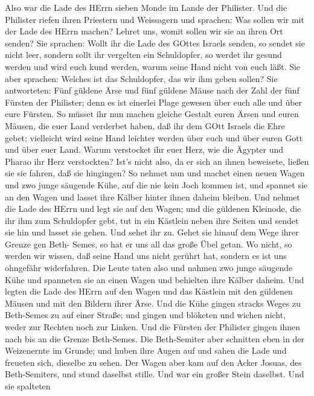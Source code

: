  Also war die Lade des HErrn sieben Monde im Lande der
Philister.  Und die Philister riefen ihren Priestern und
Weissagern und sprachen: Was sollen wir mit der Lade des HErrn machen?
Lehret uns, womit sollen wir sie an ihren Ort senden?  Sie
sprachen: Wollt ihr die Lade des GOttes Israels senden, so sendet sie
nicht leer, sondern sollt ihr vergelten ein Schuldopfer, so werdet ihr
gesund werden und wird euch kund werden, warum seine Hand nicht von euch
läßt.  Sie aber sprachen: Welches ist das Schuldopfer, das
wir ihm geben sollen? Sie antworteten: Fünf güldene Ärse und fünf
güldene Mäuse nach der Zahl der fünf Fürsten der Philister; denn es ist
einerlei Plage gewesen über euch alle und über eure Fürsten.
 So müsset ihr nun machen gleiche Gestalt euren Ärsen und
euren Mäusen, die euer Land verderbet haben, daß ihr dem GOtt Israels
die Ehre gebet; vielleicht wird seine Hand leichter werden über euch und
über euren Gott und über euer Land.  Warum verstocket ihr
euer Herz, wie die Ägypter und Pharao ihr Herz verstockten? Ist's nicht
also, da er sich an ihnen beweisete, ließen sie sie fahren, daß sie
hingingen?  So nehmet nun und machet einen neuen Wagen und
zwo junge säugende Kühe, auf die nie kein Joch kommen ist, und spannet
sie an den Wagen und lasset ihre Kälber hinter ihnen daheim bleiben.
 Und nehmet die Lade des HErrn und legt sie auf den Wagen;
und die güldenen Kleinode, die ihr ihm zum Schuldopfer gebt, tut in ein
Kästlein neben ihre Seiten und sendet sie hin und lasset sie gehen.
 Und sehet ihr zu. Gehet sie hinauf dem Wege ihrer Grenze
gen Beth- Semes, so hat er uns all das große Übel getan. Wo nicht, so
werden wir wissen, daß seine Hand uns nicht gerührt hat, sondern es ist
uns ohngefähr widerfahren.  Die Leute taten also und nahmen
zwo junge säugende Kühe und spanneten sie an einen Wagen und behielten
ihre Kälber daheim.  Und legten die Lade des HErrn auf den
Wagen und das Kästlein mit den güldenen Mäusen und mit den Bildern ihrer
Ärse.  Und die Kühe gingen stracks Weges zu Beth-Semes zu
auf einer Straße; und gingen und blöketen und wichen nicht, weder zur
Rechten noch zur Linken. Und die Fürsten der Philister gingen ihnen nach
bis an die Grenze Beth-Semes.  Die Beth-Semiter aber
schnitten eben in der Weizenernte im Grunde; und huben ihre Augen auf
und sahen die Lade und freueten sich, dieselbe zu sehen. 
Der Wagen aber kam auf den Acker Josuas, des Beth-Semiters, und stund
daselbst stille. Und war ein großer Stein daselbst. Und sie spalteten
